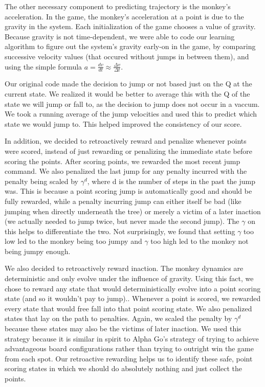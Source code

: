 \documentclass[11pt]{article}
\begin{document}
The other necessary component to predicting trajectory is the monkey's acceleration. In the game, the monkey's acceleration at a point is due to the gravity in the system. Each initialization of the game chooses a value of gravity. Because gravity is not time-dependent, we were able to code our learning algorithm to figure out the system's gravity early-on in the game, by comparing successive velocity values (that occured without jumps in between them), and using the simple formula $a=\frac{dv}{dt}\approx\frac{\Delta v}{\Delta t}$.

Our original code made the decision to jump or not based just on the Q at the current state.  We realized it would be better to average this with the Q of the state we will jump or fall to, as the decision to jump does not occur in a vaccum.  We took a running average of the jump velocities and used this to predict which state we would jump to. This helped improved  the consistency of our score.

In addition, we decided to retroactively reward and penalize whenever points were scored, instead of just rewarding or penalizing the immediate state before scoring the points.  After scoring points, we rewarded the most recent jump command.  We also penalized the last jump for any penalty incurred with the penalty being scaled by $\gamma^d$, where d is the number of steps in the past the jump was. This is because a point scoring jump is automatically good and should be fully rewarded, while a penalty incurring jump can either  itself be bad (like jumping when directly underneath the tree) or merely a victim of a later inaction (we actually needed to jump twice, but never made the second jump).  The $\gamma$ on this helps to differentiate the two.  Not surprisingly, we found that setting $\gamma$ too low led to the monkey being too jumpy and $\gamma$ too high led to the monkey not being jumpy enough.

We also decided to retroactively reward inaction.  The monkey dynamics are deterministic and only evolve under the influence of gravity.  Using this fact, we chose to reward any state that would deterministically evolve into a point scoring state (and so it wouldn't pay to jump)..  Whenever a point is scored, we rewarded every state that would free fall into that point scoring state.  We also penalized states that lay on the path to penalties.  Again, we scaled the penalty by $\gamma^d$ because these states may also be the victims of later inaction.  We used this strategy because it is similar in spirit to Alpha Go's strategy of trying to achieve advantageous board configurations rather than trying to outright win the game from each spot.  Our retroactive rewarding helps us to identify these safe, point scoring states in which we should do absolutely nothing and just collect the points.
\end{document}
